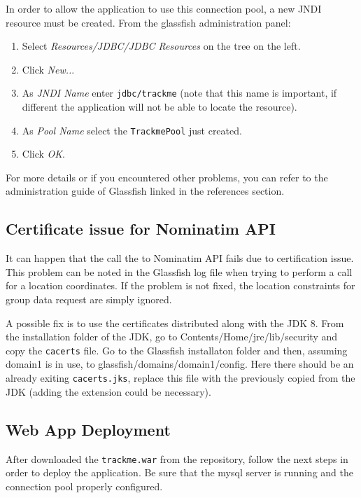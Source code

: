 \noindent
In order to allow the application to use this connection pool, a new JNDI resource must be created.
From the glassfish administration panel:

\begin{enumerate}
\item Select \textit{Resources/JDBC/JDBC Resources} on the tree on the left.
\item Click \textit{New..}.
\item As \textit{JNDI Name} enter \texttt{jdbc/trackme} (note that this name is important, if different the application will not be able to locate the resource).
\item As \textit{Pool Name} select the \texttt{TrackmePool} just created.
\item Click \textit{OK}.
\end{enumerate}

For more details or if you encountered other problems, you can refer to the administration guide of Glassfish linked in the references section.
\subsection{Certificate issue for Nominatim API}
It can happen that the call the to Nominatim API fails due to certification issue.
This problem can be noted in the Glassfish log file when trying to perform a call for a location coordinates.
If the problem is not fixed, the location constraints for group data request are simply ignored.
\vspace{1em}

\noindent
A possible fix is to use the certificates distributed along with the JDK 8.
From the installation folder of the JDK, go to Contents/Home/jre/lib/security and copy the \texttt{cacerts} file.
Go to the Glassfish installaton folder and then, assuming domain1 is in use, to glassfish/domains/domain1/config.
Here there should be an already exiting \texttt{cacerts.jks}, replace this file with the previously copied from the JDK (adding the extension could be necessary).




\subsection{Web App Deployment}
After downloaded the \texttt{trackme.war} from the repository, follow the next steps in order to deploy the application. Be sure that the mysql server is running and the connection pool properly configured.

